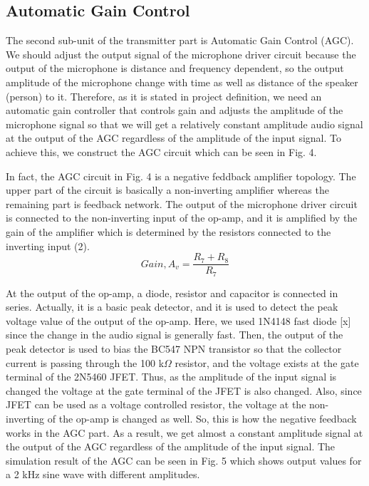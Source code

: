 \documentclass[conference]{IEEEtran}
\begin{document}
\subsection{Automatic Gain Control}
The second sub-unit of the transmitter part is Automatic Gain Control (AGC). We should adjust the output signal of the microphone driver circuit because the output of the microphone is distance and frequency dependent, so the output amplitude of the microphone change with time as well as distance of the speaker (person) to it. Therefore, as it is stated in project definition, we need an automatic gain controller that controls gain and adjusts the amplitude of the microphone signal so that we will get a relatively constant amplitude audio signal at the output of the AGC regardless of the amplitude of the input signal. To achieve this, we construct the AGC circuit which can be seen in Fig. 4.
\par In fact, the AGC circuit in Fig. 4 is a negative feddback amplifier topology. The upper part of the circuit is basically a non-inverting amplifier whereas the remaining part is feedback network. The output of the microphone driver circuit is connected to the non-inverting input of the op-amp, and it is amplified by the gain of the amplifier which is determined by the resistors connected to the inverting input (2). 
\begin{equation}\label{eq:2}
        Gain, A_v = \frac{R_7+R_8}{R_7} 
 \end{equation}
\par At the output of the op-amp, a diode, resistor and capacitor is connected in series. Actually, it is a basic peak detector, and it is used to detect the peak voltage value of the output of the op-amp. Here, we used 1N4148 fast diode [x] since the change in the audio signal is generally fast. Then, the output of the peak detector is used to bias the BC547 NPN transistor so that the collector current is passing through the 100 k\(\Omega\) resistor, and the voltage exists at the gate terminal of the 2N5460 JFET. Thus, as the amplitude of the input signal is changed the voltage at the gate terminal of the JFET is also changed. Also, since JFET can be used as a voltage controlled resistor, the voltage at the non-inverting of the op-amp is changed as well. So, this is how the negative feedback works in the AGC part. As a result, we get almost a constant amplitude signal at the output of the AGC regardless of the amplitude of the input signal. The simulation result of the AGC can be seen in Fig. 5 which shows output values for a 2 kHz sine wave with different amplitudes.
\end{document}
